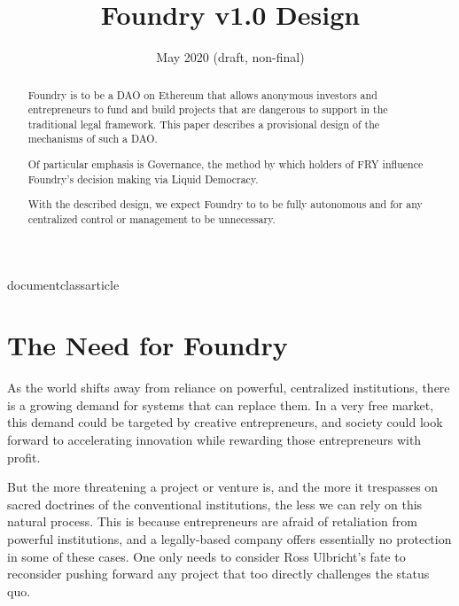 documentclass{article}

\usepackage[margin=1.85in]{geometry}

\usepackage{hyperref}
\hypersetup{
    colorlinks=true,
    linkcolor=blue,
    filecolor=magenta,
    urlcolor=cyan,
}

\title{Foundry v1.0 Design}
\date{May 2020 (draft, non-final)}



\maketitle
\begin{abstract}
	\setlength{\parskip}{1em}
	Foundry is to be a DAO on Ethereum that allows anonymous investors and entrepreneurs to fund and build projects that are dangerous to support in the traditional legal framework. This paper describes a provisional design of the mechanisms of such a DAO.
	
	Of particular emphasis is Governance, the method by which holders of FRY influence Foundry's decision making via Liquid Democracy.
	
	With the described design, we expect Foundry to to be fully autonomous and for any centralized control or management to be unnecessary.
\end{abstract}

\newpage
{}
\tableofcontents

\setlength{\parskip}{0.5em}

\newpage
{}
\section{The Need for Foundry} \label{need}

As the world shifts away from reliance on powerful, centralized institutions, there is a growing demand for systems that can replace them. In a very free market, this demand could be targeted by creative entrepreneurs, and society could look forward to accelerating innovation while rewarding those entrepreneurs with profit.

But the more threatening a project or venture is, and the more it trespasses on sacred doctrines of the conventional institutions, the less we can rely on this natural process. This is because entrepreneurs are afraid of retaliation from powerful institutions, and a legally-based company offers essentially no protection in some of these cases. One only needs to consider Ross Ulbricht's fate to reconsider pushing forward any project that too directly challenges the status quo.

